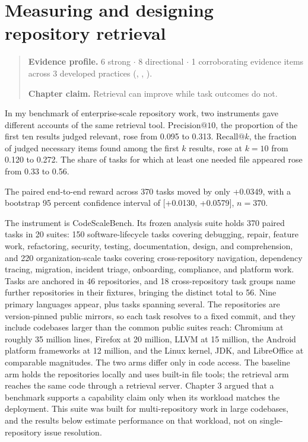 \chapter{Measuring and designing repository retrieval}
\label{ch12-measuring-designing-repository-retrieval}
\begin{quote}
\textbf{Evidence profile.} 6 strong \(\cdot\) 8 directional \(\cdot\) 1 corroborating evidence items across 3 developed practices (, , ).

\textbf{Chapter claim.} Retrieval can improve while task outcomes do not.
\end{quote}

In my benchmark of enterprise-scale repository work, two instruments gave different accounts of the same retrieval tool. \(\mathrm{Precision}@10\), the proportion of the first ten results judged relevant, rose from 0.095 to 0.313. \textbf{\(\mathrm{Recall}@k\)}, the fraction of judged necessary items found among the first \(k\) results, rose at \(k = 10\) from 0.120 to 0.272. The share of tasks for which at least one needed file appeared rose from 0.33 to 0.56.

The paired end-to-end reward across 370 tasks moved by only +0.0349, with a bootstrap 95 percent confidence interval of {[}+0.0130, +0.0579{]}, \(n = 370\).

The instrument is CodeScaleBench. Its frozen analysis suite holds 370 paired tasks in 20 suites: 150 software-lifecycle tasks covering debugging, repair, feature work, refactoring, security, testing, documentation, design, and comprehension, and 220 organization-scale tasks covering cross-repository navigation, dependency tracing, migration, incident triage, onboarding, compliance, and platform work. Tasks are anchored in 46 repositories, and 18 cross-repository task groups name further repositories in their fixtures, bringing the distinct total to 56. Nine primary languages appear, plus tasks spanning several. The repositories are version-pinned public mirrors, so each task resolves to a fixed commit, and they include codebases larger than the common public suites reach: Chromium at roughly 35 million lines, Firefox at 20 million, LLVM at 15 million, the Android platform frameworks at 12 million, and the Linux kernel, JDK, and LibreOffice at comparable magnitudes. The two arms differ only in code access. The baseline arm holds the repositories locally and uses built-in file tools; the retrieval arm reaches the same code through a retrieval server. Chapter 3 argued that a benchmark supports a capability claim only when its workload matches the deployment. This suite was built for multi-repository work in large codebases, and the results below estimate performance on that workload, not on single-repository issue resolution.

